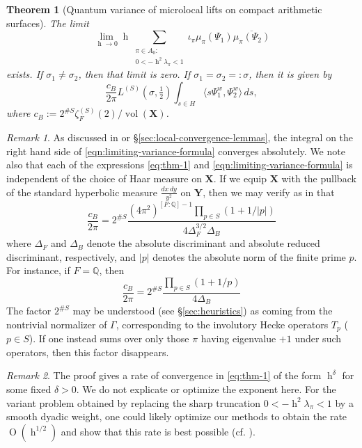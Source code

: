 \documentclass[reqno,10pt]{amsart}
\theoremstyle{plain} %
\newtheorem{theorem}             {Theorem}
\theoremstyle{definition}
\theoremstyle{plain} %
\theoremstyle{remark}
\newtheorem{remark}             {Remark}
\theoremstyle{itplain} %
\theoremstyle{remark} %
\numberwithin{equation}{section}
\def\O{\operatorname{O}}
\DeclareMathOperator{\vol}{vol}
\DeclareMathOperator{\h}{h}
\def\p{{p}}
\begin{document}
\begin{theorem}[Quantum variance of microlocal lifts on compact arithmetic surfaces]\label{thm:var-3}
  The limit
  \begin{equation}\label{eq:thm-1}
    \lim_{\h \rightarrow 0}
    \h
    \sum_{
      \substack{
        \pi \in A_0 : \\
        0 < -\h^2 \lambda_\pi < 1
      }
    }
    \iota_{\pi}
    \mu_\pi(\Psi_1)
    \overline{\mu_\pi(\Psi_2)}
  \end{equation}
  exists.  If $\sigma_1 \neq \sigma_2$, then that limit is zero.  If $\sigma_1 = \sigma_2 =: \sigma$, then it is given by
  \begin{equation}\label{eqn:limiting-variance-formula}
    \frac{c_B}{2 \pi}
    L^{(S)}(\sigma,\tfrac{1}{2})
    \int_{s \in H}
    \langle s \Psi_1^w, \Psi_2^w \rangle \,d s,
  \end{equation}
  where $c_B := 2^{\# S} \zeta_F^{(S)}(2) / \vol(\mathbf{X})$.
\end{theorem}

\begin{remark}
  As discussed in \cite{2013arXiv1303.6972S} or \S\ref{sec:local-convergence-lemmas}, the integral on the right hand side of \eqref{eqn:limiting-variance-formula} converges absolutely.  We note also that each of the expressions \eqref{eq:thm-1} and \eqref{eqn:limiting-variance-formula} is independent of the choice of Haar measure on $\mathbf{X}$.  If we equip $\mathbf{X}$ with the pullback of the standard hyperbolic measure $\frac{d x \, d y}{y^2}$ on $\mathbf{Y}$, then we may verify as in \cite[\S1]{watson-2008} that
  \[
    \frac{c_B}{2 \pi} = 2^{\# S} \frac { (4 \pi^2)^{[F:\mathbb{Q}]-1} \prod_{\p \in S} (1 + 1/|\p|) } { 4 \Delta_F^{3/2} \Delta_B }
  \]
  where $\Delta_F$ and $\Delta_B$ denote the absolute discriminant and absolute reduced discriminant, respectively, and $|\p|$ denotes the absolute norm of the finite prime $\p$.  For instance, if $F = \mathbb{Q}$, then
  \[
    \frac{c_B}{2 \pi} = 2^{\# S} \frac { \prod_{p \in S} (1 + 1/p) } { 4 \Delta_B }
  \]
  The factor $2^{\# S}$ may be understood (see \S\ref{sec:heuristics}) as coming from the nontrivial normalizer of $\Gamma$, corresponding to the involutory Hecke operators $T_{\p}$ ($\p \in S$).  If one instead sums over only those $\pi$ having eigenvalue $+1$ under such operators, then this factor disappears.
\end{remark}

\begin{remark}\label{rmk:var-quat-annals-submission:proof-gives-rate}
  The proof gives a rate of convergence in \eqref{eq:thm-1} of the form $\h^{\delta}$ for some fixed $\delta > 0$.  We do not explicate or optimize the exponent here.  For the variant problem obtained by replacing the sharp truncation $0 < - \h^2 \lambda_\pi < 1$ by a smooth dyadic weight, one could likely optimize our methods to obtain the rate $\O(\h^{1/2})$ and show that this rate is best possible (cf. \cite[\S6.5]{nelson-variance-73-2}).
\end{remark}
\end{document}
